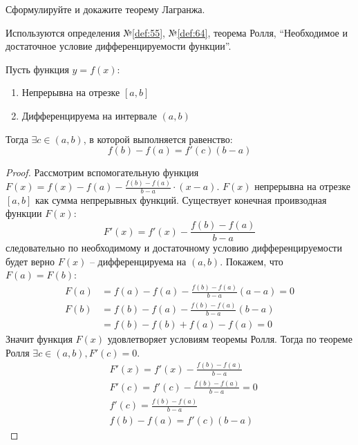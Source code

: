\begin{question}
    Сформулируйте и докажите теорему Лагранжа.
\end{question}
\begin{used}
    Используются определения №\ref{def:55}, №\ref{def:64}, теорема Ролля, ``Необходимое и достаточное условие дифференцируемости функции''.
\end{used}
\begin{theorem}
    Пусть функция $y = f(x)$:
    \begin{enumerate}
        \item Непрерывна на отрезке $[a, b]$
        \item Дифференцируема на интервале  $(a, b)$
    \end{enumerate}
    Тогда $\exists  c \in (a, b)$, в которой выполняется равенство: \[
        f(b) - f(a) = f'(c)(b - a)
    \] 
\end{theorem}
\begin{proof}
    Рассмотрим вспомогательную функция $F(x) = f(x) - f(a) - \frac{f(b) - f(a)}{b - a} \cdot (x - a)$. 
    $F(x)$ непрерывна на отрезке $[a, b]$ как сумма непрерывных функций. Существует конечная проивзодная функции $F(x)$: \[
        F'(x) = f'(x) - \frac{f(b) - f(a)}{b - a}
    \]
    следовательно по необходимому и достаточному условию дифференцируемости будет верно $F(x)$ -- дифференцируема на $(a, b)$.
    Покажем, что $F(a) = F(b)$:
    \begin{align*}
        F(a) &= f(a) - f(a) - \frac{f(b) - f(a)}{b - a}(a - a) = 0 \\
        F(b) &= f(b) - f(a) - \frac{f(b) - f(a)}{b - a}(b - a) \\
             &= f(b) - f(b) + f(a) - f(a) = 0
    \end{align*}
    Значит функция $F(x)$ удовлетворяет условиям теоремы Ролля. Тогда по теореме Ролля  $\exists c \in (a, b), F'(c) = 0$.
    \begin{align*}
        & F'(x) = f'(x) - \frac{f(b) - f(a)}{b - a} \\
        & F'(c) = f'(c) - \frac{f(b) - f(a)}{b - a} = 0 \\
        & f'(c) = \frac{f(b) - f(a)}{b - a} \\
        & f(b) - f(a) = f'(c) (b - a)
    \end{align*}
\end{proof}
\pagebreak



